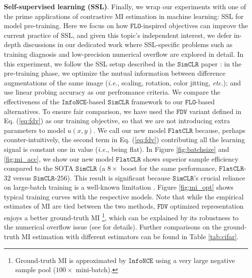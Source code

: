 \documentclass{article}
\theoremstyle{plain}
\theoremstyle{definition}
\theoremstyle{remark}
\newcommand{\infonce}{\texttt{InfoNCE}}
\newcommand{\FLO}{\texttt{FLO}}
\newcommand{\FDV}{\texttt{FDV}}
\newcommand{\SimCLR}{\texttt{SimCLR}}
\newcommand{\FCLR}{\texttt{FlatCLR}}
\begin{document}
		
		{\bf Self-supervised learning (SSL)}. Finally, we wrap our experiments with one of the prime applications of contrastive MI estimation in machine learning: SSL for model pre-training. Here we focus on how $\FLO$-inspired objectives can improve the current practice of SSL, and given this topic's independent interest, we defer in-depth discussions in our dedicated work \citep{chen2021simpler} where SSL-specific problems such as training diagnosis and low-precision numerical overflow are explored in detail. In this experiment, we follow the SSL setup described in the $\SimCLR$ paper \citep{chen2020simple}: in the pre-training phase, we optimize the mutual information between difference augmentations of the same image ({\it i.e.}, scaling, rotation, color jitting, {\it etc.}); and use linear probing accuracy as our perfromance criteria. 
		We compare the effectiveness of the $\infonce$-based $\SimCLR$ framework \citep{chen2020simple} to our $\FLO$-based alternatives. To ensure fair comparison, we have used the $\FDV$ variant defined in Eq. (\ref{eq:fdv}) as our training objective, so that we are not introducing extra parameters to model $u(x,y)$. We call our new model $\FCLR$ because, perhaps counter-intuitively, the second term in Eq. (\ref{eq:fdv}) contributing all the learning signal is constant one in value ({\it i.e.}, being flat). In  Figure \ref{fig:batchsize} and \ref{fig:mi_acc}, we show our new model $\FCLR$ shows superior sample efficiency compared to the SOTA $\SimCLR$ (a $8 \times$ boost for the same performance, $\FCLR$-$32$ versus $\SimCLR$-$256$). This result is significant because $\SimCLR$'s crucial reliance on large-batch training is a well-known limitation \citep{haochen2021provable, yuan2022provable, lee2022r}. Figure \ref{fig:mi_opt} shows typical training curves with the respective models. Note that while the empirical estimates of MI are tied between the two methods, $\FDV$ optimized representation enjoys a better ground-truth MI \footnote{Ground-truth MI is approximated by $\infonce$ using a very large negative sample pool ($100 \times$ mini-batch).}, which can be explained by its robustness to the numerical overflow issue (see \citep{chen2021simpler} for details). Further comparisons on the ground-truth MI estimation with different estimators can be found in Table \ref{tab:cifar}. 
		
		
		
		
		
		
\end{document}
